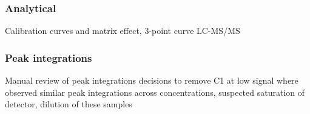 \subsubsection{Analytical}
Calibration curves and matrix effect, 3-point curve
LC-MS/MS

\subsubsection{Peak integrations}
Manual review of peak integrations
decisions to remove C1 at low signal
where observed similar peak integrations across concentrations, suspected saturation of detector, dilution of these samples